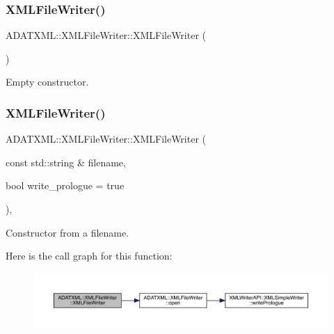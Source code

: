 \subsubsection{\texorpdfstring{XMLFileWriter()}{XMLFileWriter()}\hspace{0.1cm}{\footnotesize\ttfamily [3/6]}}
{\footnotesize\ttfamily A\+D\+A\+T\+X\+M\+L\+::\+X\+M\+L\+File\+Writer\+::\+X\+M\+L\+File\+Writer (\begin{DoxyParamCaption}{ }\end{DoxyParamCaption})}



Empty constructor. 

\mbox{\label{classADATXML_1_1XMLFileWriter_a83cf749ff969a30d3de1895f271b238a}} 
\subsubsection{\texorpdfstring{XMLFileWriter()}{XMLFileWriter()}\hspace{0.1cm}{\footnotesize\ttfamily [4/6]}}
{\footnotesize\ttfamily A\+D\+A\+T\+X\+M\+L\+::\+X\+M\+L\+File\+Writer\+::\+X\+M\+L\+File\+Writer (\begin{DoxyParamCaption}\item[{const std\+::string \&}]{filename,  }\item[{bool}]{write\+\_\+prologue = {\ttfamily true} }\end{DoxyParamCaption})\hspace{0.3cm}{\ttfamily [inline]}, {\ttfamily [explicit]}}



Constructor from a filename. 

Here is the call graph for this function\+:
\nopagebreak
\begin{figure}[H]
\begin{center}
\leavevmode
\includegraphics[width=350pt]{d6/ddb/classADATXML_1_1XMLFileWriter_a83cf749ff969a30d3de1895f271b238a_cgraph}
\end{center}
\end{figure}
\mbox{\label{classADATXML_1_1XMLFileWriter_af3d1109d92631884682eac46624ca7fd}} 
